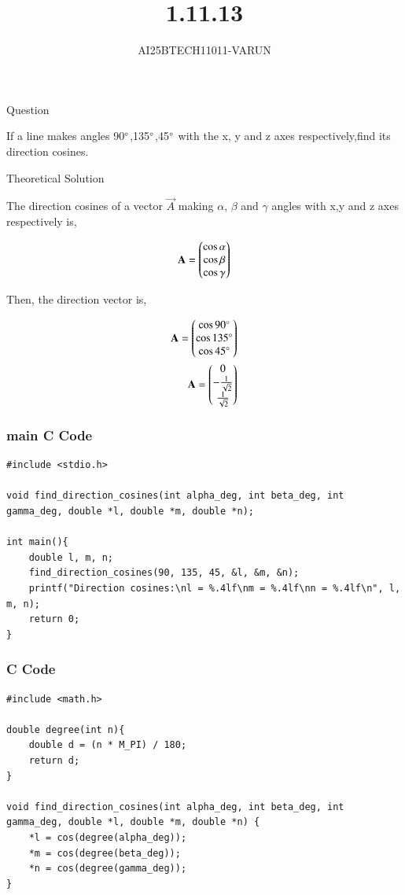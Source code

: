 \documentclass{beamer}
\title %
{1.11.13}
\author %
{AI25BTECH11011-VARUN}
\begin{document}
\frame{\titlepage}
\begin{frame}{Question}

If a line makes angles 90$\degree$,135$\degree$,45$\degree$ with the x, y and z axes respectively,find its direction cosines.

\end{frame}

\begin{frame}{Theoretical Solution}

The direction cosines of a vector $\vec{A}$ making $\alpha$, $\beta$ and $\gamma$ angles with x,y and z axes respectively is,

\begin{align}
    \mathbf{A} = \begin{pmatrix}\cos{\alpha} \\ \cos{\beta} \\ \cos{\gamma}\end{pmatrix}
\end{align}

Then, the direction vector is,

\begin{align}
    \mathbf{A} = \begin{pmatrix}\cos{90\degree} \\ \cos{135\degree} \\ \cos{45\degree}\end{pmatrix}  \\
    \mathbf{A} = \begin{pmatrix}0 \\ -\frac{1}{\sqrt{2}} \\ \frac{1}{\sqrt{2}}\end{pmatrix}
\end{align}

\end{frame}


\begin{frame}[fragile]
    \frametitle{main C Code}

    \begin{lstlisting}
#include <stdio.h>

void find_direction_cosines(int alpha_deg, int beta_deg, int gamma_deg, double *l, double *m, double *n);

int main(){
    double l, m, n;
    find_direction_cosines(90, 135, 45, &l, &m, &n);
    printf("Direction cosines:\nl = %.4lf\nm = %.4lf\nn = %.4lf\n", l, m, n);
    return 0;
}
    \end{lstlisting}
\end{frame}

\begin{frame}[fragile]
    \frametitle{C Code}
    
    \begin{lstlisting}
#include <math.h>

double degree(int n){
    double d = (n * M_PI) / 180;
    return d;
}

void find_direction_cosines(int alpha_deg, int beta_deg, int gamma_deg, double *l, double *m, double *n) {
    *l = cos(degree(alpha_deg));
    *m = cos(degree(beta_deg));
    *n = cos(degree(gamma_deg));
}
    \end{lstlisting}
\end{frame}
\end{document}
